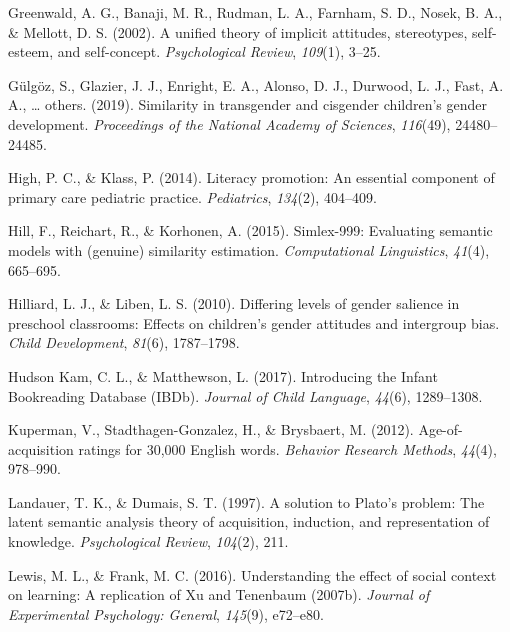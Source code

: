 \documentclass[english,,man,floatsintext]{apa6}
\begin{document}
\leavevmode\hypertarget{ref-greenwald2002unified}{}%
Greenwald, A. G., Banaji, M. R., Rudman, L. A., Farnham, S. D., Nosek, B. A., \& Mellott, D. S. (2002). A unified theory of implicit attitudes, stereotypes, self-esteem, and self-concept. \emph{Psychological Review}, \emph{109}(1), 3--25.

\leavevmode\hypertarget{ref-gulgoz2019similarity}{}%
Gülgöz, S., Glazier, J. J., Enright, E. A., Alonso, D. J., Durwood, L. J., Fast, A. A., \ldots{} others. (2019). Similarity in transgender and cisgender children's gender development. \emph{Proceedings of the National Academy of Sciences}, \emph{116}(49), 24480--24485.

\leavevmode\hypertarget{ref-high2014literacy}{}%
High, P. C., \& Klass, P. (2014). Literacy promotion: An essential component of primary care pediatric practice. \emph{Pediatrics}, \emph{134}(2), 404--409.

\leavevmode\hypertarget{ref-hill2015simlex}{}%
Hill, F., Reichart, R., \& Korhonen, A. (2015). Simlex-999: Evaluating semantic models with (genuine) similarity estimation. \emph{Computational Linguistics}, \emph{41}(4), 665--695.

\leavevmode\hypertarget{ref-hilliard2010differing}{}%
Hilliard, L. J., \& Liben, L. S. (2010). Differing levels of gender salience in preschool classrooms: Effects on children's gender attitudes and intergroup bias. \emph{Child Development}, \emph{81}(6), 1787--1798.

\leavevmode\hypertarget{ref-kam_2017}{}%
Hudson Kam, C. L., \& Matthewson, L. (2017). Introducing the Infant Bookreading Database (IBDb). \emph{Journal of Child Language}, \emph{44}(6), 1289--1308.

\leavevmode\hypertarget{ref-kuperman2012age}{}%
Kuperman, V., Stadthagen-Gonzalez, H., \& Brysbaert, M. (2012). Age-of-acquisition ratings for 30,000 English words. \emph{Behavior Research Methods}, \emph{44}(4), 978--990.

\leavevmode\hypertarget{ref-landauer1997solution}{}%
Landauer, T. K., \& Dumais, S. T. (1997). A solution to Plato's problem: The latent semantic analysis theory of acquisition, induction, and representation of knowledge. \emph{Psychological Review}, \emph{104}(2), 211.

\leavevmode\hypertarget{ref-lewis2016understanding}{}%
Lewis, M. L., \& Frank, M. C. (2016). Understanding the effect of social context on learning: A replication of Xu and Tenenbaum (2007b). \emph{Journal of Experimental Psychology: General}, \emph{145}(9), e72--e80.
\end{document}
